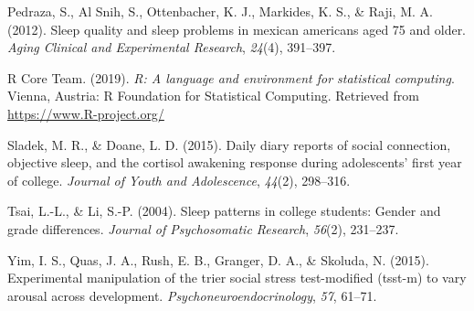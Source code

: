 \documentclass[man, fleqn, noextraspace]{apa6}
\begin{document}
\leavevmode\hypertarget{ref-pedraza2012sleep}{}%
Pedraza, S., Al Snih, S., Ottenbacher, K. J., Markides, K. S., \& Raji, M. A. (2012). Sleep quality and sleep problems in mexican americans aged 75 and older. \emph{Aging Clinical and Experimental Research}, \emph{24}(4), 391--397.

\leavevmode\hypertarget{ref-R-base}{}%
R Core Team. (2019). \emph{R: A language and environment for statistical computing}. Vienna, Austria: R Foundation for Statistical Computing. Retrieved from \url{https://www.R-project.org/}

\leavevmode\hypertarget{ref-sladek2015daily}{}%
Sladek, M. R., \& Doane, L. D. (2015). Daily diary reports of social connection, objective sleep, and the cortisol awakening response during adolescents' first year of college. \emph{Journal of Youth and Adolescence}, \emph{44}(2), 298--316.

\leavevmode\hypertarget{ref-tsai2004sleep}{}%
Tsai, L.-L., \& Li, S.-P. (2004). Sleep patterns in college students: Gender and grade differences. \emph{Journal of Psychosomatic Research}, \emph{56}(2), 231--237.

\leavevmode\hypertarget{ref-yim2015experimental}{}%
Yim, I. S., Quas, J. A., Rush, E. B., Granger, D. A., \& Skoluda, N. (2015). Experimental manipulation of the trier social stress test-modified (tsst-m) to vary arousal across development. \emph{Psychoneuroendocrinology}, \emph{57}, 61--71.

\endgroup
\end{document}
